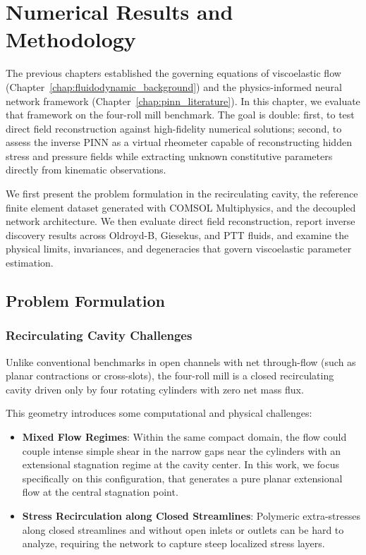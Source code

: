 \chapter{Numerical Results and Methodology}
\label{chap:results_discussion}

The previous chapters established the governing equations of viscoelastic flow
(Chapter~\ref{chap:fluidodynamic_background}) and the physics-informed neural network
framework (Chapter~\ref{chap:pinn_literature}). In this chapter, we evaluate that
framework on the four-roll mill benchmark. The goal is double: first, to test
direct field reconstruction against high-fidelity numerical solutions; second,
to assess the inverse PINN as a virtual rheometer capable of reconstructing
hidden stress and pressure fields while extracting unknown constitutive
parameters directly from kinematic observations.

We first present the problem formulation in the recirculating cavity, the
reference finite element dataset generated with COMSOL Multiphysics, and the
decoupled network architecture. We then evaluate direct field reconstruction,
report inverse discovery results across Oldroyd-B, Giesekus, and PTT fluids,
and examine the physical limits, invariances, and degeneracies that govern
viscoelastic parameter estimation.

\section{Problem Formulation}
\label{sec:problem_formulation}

\subsection{Recirculating Cavity Challenges}
\label{subsec:challenges_recirculating_pinns}

Unlike conventional benchmarks in open channels with net through-flow (such as
planar contractions or cross-slots), the four-roll mill
\cite{davino2017numerical} is a closed recirculating cavity driven only by
four rotating cylinders with zero net mass flux.

This geometry introduces some computational and physical challenges:
\begin{itemize}
    \item \textbf{Mixed Flow Regimes}:
        Within the same compact domain, the flow could couple intense simple shear
        in the narrow gaps near the cylinders with an extensional stagnation
        regime at the cavity center. In this work, we focus specifically on this configuration, that generates a pure planar
        extensional flow at the central stagnation point.
    \item \textbf{Stress Recirculation along Closed Streamlines}:
        Polymeric extra-stresses along closed streamlines and without open inlets or outlets can be hard to analyze, requiring the network to capture steep localized stress layers.
\end{itemize}

